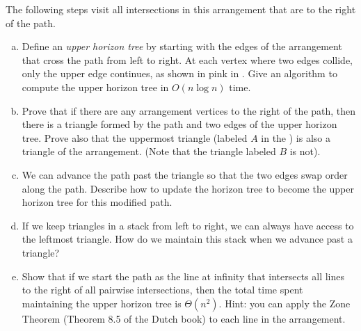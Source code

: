 \documentclass{article}
\begin{document}
The following steps
visit all intersections in this arrangement that are to the right of the path.

\begin{enumerate}[(a)]
    \item Define an \emph{upper horizon tree} by starting with the edges of the
        arrangement that cross the path from left to right. At each vertex where
        two edges collide, only the upper edge continues, as shown in pink in
        . Give an algorithm to
        compute the upper horizon tree in $O(n \log n)$ time.


    \item Prove that if there are any arrangement vertices to the right of the
        path, then there is a triangle formed by the path and two edges of the
        upper horizon tree.  Prove also that the uppermost triangle (labeled
        $A$ in the ) is also a triangle of the arrangement.  (Note that
        the triangle labeled $B$ is not).


    \item We can advance the path past the triangle so that the two edges swap
        order along the path.  Describe how to update the horizon tree to become
        the upper horizon tree for this modified path.


    \item If we keep triangles in a stack from left to right, we can always have
        access to the leftmost triangle.  How do we maintain this stack when we
        advance past a triangle?


    \item Show that if we start the path as the line at infinity that intersects
        all lines to the right of all pairwise intersections, then
        the total time spent maintaining the upper horizon tree is
        $\Theta(n^2)$.  Hint: you can apply the Zone Theorem (Theorem 8.5 of the
        Dutch book) to each line in the arrangement.


\end{enumerate}
\end{document}
